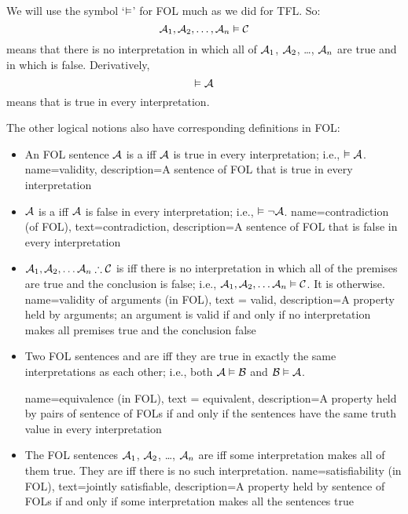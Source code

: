 We will use the symbol `$\vDash$' for FOL much as we did for TFL. So:
	$$\mathcal{A}_1, \mathcal{A}_2, \ldots, \mathcal{A}_n \vDash\mathcal{C}$$
means that there is no interpretation in which all of $\mathcal{A}_1$, $\mathcal{A}_2$, \dots, $\mathcal{A}_n$ are true and in which  is false. Derivatively,
	$$\vDash\mathcal{A}$$
means that  is true in every interpretation.

The other logical notions also have corresponding definitions in FOL:

\begin{itemize}
\item An FOL sentence $\mathcal{A}$ is a  iff $\mathcal{A}$ is true in every interpretation; i.e.,  $\vDash\mathcal{A}$.
{
name=validity,
description={A \gls{sentence of FOL} that is true in every \gls{interpretation}}
}

\item $\mathcal{A}$ is a  iff $\mathcal{A}$ is false in every interpretation; i.e., $\vDash\neg\mathcal{A}$.
{
  name=contradiction (of FOL),
  text=contradiction,
description={A \gls{sentence of FOL} that is false in every \gls{interpretation}}
}
  
\item $\metav{A}_1, \metav{A}_2, \ldots \metav{A}_n \therefore \metav{C}$ is  iff there is no interpretation in which all of the premises are true and the conclusion is false; i.e., $\mathcal{A}_1,\mathcal{A}_2,\ldots \mathcal{A}_n \vDash\mathcal{C}$. It is  otherwise.
{
  name=validity of arguments (in FOL),
  text = valid,
description={A property held by arguments; an argument is valid if and only if no \gls{interpretation} makes all premises true and the conclusion false}
}

\item Two FOL sentences  and  are  iff they are true in exactly the same interpretations as each other; i.e., both $\mathcal{A}\vDash\mathcal{B}$ and $\mathcal{B}\vDash\mathcal{A}$.

{
  name=equivalence (in FOL),
  text = equivalent,
description={A property held by pairs of \glspl{sentence of FOL} if and only if the sentences have the same truth value in every \gls{interpretation}}
}

\item The FOL sentences $\mathcal{A}_1$, $\mathcal{A}_2$, \dots, $\mathcal{A}_n$ are  iff some interpretation makes all of them true. They are  iff there is no such interpretation.
{
  name=satisfiability (in FOL),
  text=jointly satisfiable,
description={A property held by \glspl{sentence of FOL} if and only if some \gls{interpretation} makes all the sentences true}
}
\end{itemize}

